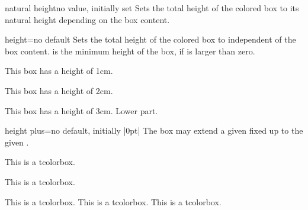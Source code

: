 \begin{docTcbKey}{natural height}{}{no value, initially set}
  Sets the total height of the colored box to its natural height depending
  on the box content.
\end{docTcbKey}

\begin{docTcbKey}{height}{=}{no default}
  Sets the total height of the colored box to  independent
  of the box content.  is the minimum height of the box, if
   is larger than zero.
\begin{dispExample}

\begin{tcolorbox}[height=1cm,valign=center]
  This box has a height of 1cm.
\end{tcolorbox}
\begin{tcolorbox}[height=2cm,valign=center]
  This box has a height of 2cm.
\end{tcolorbox}
\begin{tcolorbox}[height=3cm,split=0.5,valign=center,valign lower=center]
  This box has a height of 3cm.
  \tcblower
  Lower part.
\end{tcolorbox}
\end{dispExample}
\end{docTcbKey}

\enlargethispage*{10mm}
\begin{docTcbKey}{height plus}{=}{no default, initially |0pt|}
  The box may extend a given fixed  up to the given .
\begin{dispExample}

\begin{tcolorbox}[height=1cm]
This is a tcolorbox.
\end{tcolorbox}
\begin{tcolorbox}[height=1cm,height plus=1cm]
This is a tcolorbox.
\end{tcolorbox}
\begin{tcolorbox}[height=1cm,height plus=1cm]
This is a tcolorbox. This is a tcolorbox. This is a tcolorbox.
\end{tcolorbox}
\end{dispExample}
\end{docTcbKey}


